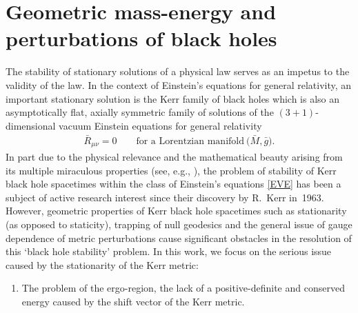 \documentclass[pdftex]{sigma}
\numberwithin{equation}{section}
\begin{document}

{\small
\tableofcontents

}

\section{Geometric mass-energy and perturbations of black holes}

The stability of stationary solutions of a physical law serves as an impetus to the validity of the law. In the context of Einstein's equations for general relativity, an important stationary solution is the Kerr family of black holes which is also an asymptotically flat, axially symmetric family of solutions of the $(3+1)$-dimensional vacuum Einstein equations for general relativity
\begin{align}\label{EVE}
\bar{R}_{\mu \nu} =0 \qquad \text{for a Lorentzian manifold} \ \bigl(\bar{M}, \bar{g}\bigr).
\end{align}
In part due to the physical relevance and the mathematical beauty arising from its multiple miraculous properties (see, e.g., \cite{Chandrasekhar_83, Teukolsky_15}), the problem of stability of Kerr black hole spacetimes within the class of Einstein's equations \eqref{EVE} has been a subject of active research interest since their discovery by R.~Kerr in~1963. However, geometric properties of Kerr black hole spacetimes such as stationarity (as opposed to staticity), trapping of null geodesics and the general issue of gauge dependence of metric perturbations cause significant obstacles in the resolution of this `black hole stability' problem.
In this work, we focus on the serious issue caused by the stationarity of the Kerr metric:
\begin{enumerate}\setlength{\leftskip}{0.03cm}
\item [(P1)] The problem of the ergo-region, the lack of a positive-definite and conserved energy caused by the shift vector of the Kerr metric.
\end{enumerate}
\end{document}
